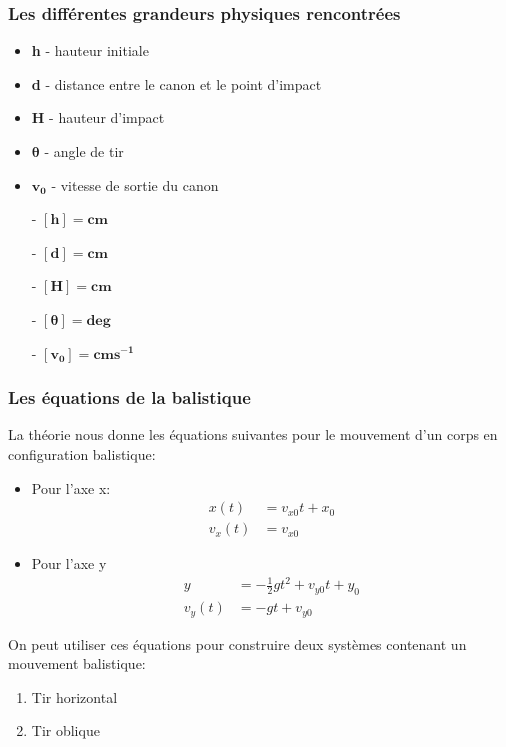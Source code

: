\documentclass[12pt,a4paper]{article}
\begin{document}
    \subsubsection{Les différentes grandeurs physiques rencontrées}
    \begin{minipage}{0.6\linewidth}
        \begin{itemize}
            \item \textbf{h} - hauteur initiale 
            \item \textbf{d} - distance entre le canon et le point d'impact 
            \item \textbf{H} - hauteur d'impact
            \item $\bm{\theta}$ - angle de tir 
            \item $\bm{v_0}$ - vitesse de sortie du canon
        \end{itemize}
    \end{minipage}%
    \hfill
    \begin{minipage}{0.4\linewidth}
        \begin{itemize}
            \item[-] $\bm{[h]=cm}$
            \item[-] $\bm{[d]=cm}$
            \item[-] $\bm{[H]=cm}$
            \item[-] $\bm{[\theta]=deg}$
            \item[-] $\bm{[v_0]=cms^{-1}}$
        \end{itemize}   
    \end{minipage}
    \subsubsection{Les équations de la balistique}
    La théorie nous donne les équations suivantes pour le mouvement d'un corps en configuration balistique:
    \begin{itemize}
        \item Pour l'axe x:
        \begin{align*}
            x(t)&=v_{x0}t+x_0 \\
            v_x(t)&=v_{x0}
        \end{align*}
        \item Pour l'axe y
        \begin{align*}
            y&=-\frac{1}{2}gt^2+v_{y0}t+y_0 \\
            v_y(t)&=-gt+v_{y0}
        \end{align*}
    \end{itemize}
    On peut utiliser ces équations pour construire deux systèmes contenant un mouvement balistique:
    \begin{enumerate}
        \item Tir horizontal
        \item Tir oblique
    \end{enumerate}
\end{document}
